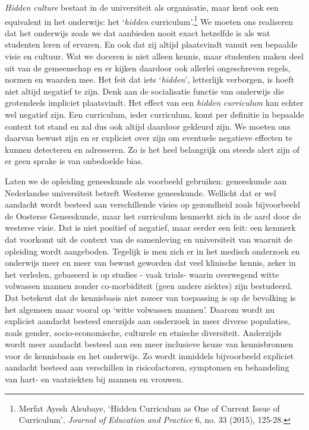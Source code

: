 \documentclass[smallauthor, chapterhaspagenum, nochapterinheader, pagenuminheader,  bigchapnum,medium2, tocpages,  garamond, titleinheader]{jote-book}
\begin{document}
	\emph{Hidden}\emph{ culture} bestaat in de universiteit als organisatie, maar kent ook een equivalent in het onderwijs: het ‘\emph{hidden} curriculum'.\footnote{Merfat Ayesh Alsubaye, ‘Hidden Curriculum as One of Current Issue of Curriculum', \emph{Journal of }\emph{Education}\emph{ }\emph{and}\emph{ }\emph{Practice}\emph{ }6, no. 33 (2015), 125-28.} We moeten ons realiseren dat het onderwijs zoals we dat aanbieden nooit exact hetzelfde is als wat studenten leren of ervaren. En ook dat zij altijd plaatsvindt vanuit een bepaalde visie en cultuur. Wat we doceren is niet alleen kennis, maar studenten maken deel uit van de gemeenschap en er kijken daardoor ook allerlei ongeschreven regels, normen en waarden mee. Het feit dat iets ‘\emph{hidden}', letterlijk verborgen, is hoeft niet altijd negatief te zijn. Denk aan de socialisatie functie van onderwijs die grotendeels impliciet plaatsvindt. Het effect van een \emph{hidden}\emph{ curriculum} kan echter wel negatief zijn. Een curriculum, ieder curriculum, komt per definitie in bepaalde context tot stand en zal dus ook altijd daardoor gekleurd zijn. We moeten ons daarvan bewust zijn en er expliciet over zijn om eventuele negatieve effecten te kunnen detecteren en adresseren. Zo is het heel belangrijk om steeds alert zijn of er geen sprake is van onbedoelde bias.



	Laten we de opleiding geneeskunde als voorbeeld gebruiken: geneeskunde aan Nederlandse universiteit betreft Westerse geneeskunde. Wellicht dat er wel aandacht wordt besteed aan verschillende visies op gezondheid zoals bijvoorbeeld de Oosterse Geneeskunde, maar het curriculum kenmerkt zich in de aard door de westerse visie. Dat is niet positief of negatief, maar eerder een feit: een kenmerk dat voorkomt uit de context van de samenleving en universiteit van waaruit de opleiding wordt aangeboden. Tegelijk is men zich er in het medisch onderzoek en onderwijs meer en meer van bewust geworden dat veel klinische kennis, zeker in het verleden, gebaseerd is op studies - vaak trials- waarin overwegend witte volwassen mannen zonder co-morbiditeit (geen andere ziektes) zijn bestudeerd. Dat betekent dat de kennisbasis niet zozeer van toepassing is op de bevolking is het algemeen maar vooral op ‘witte volwassen mannen'. Daarom wordt nu expliciet aandacht besteed enerzijds aan onderzoek in meer diverse populaties, zoals gender, socio-economische, culturele en etnische diversiteit. Anderzijds wordt meer aandacht besteed aan een meer inclusieve keuze van kennisbronnen voor de kennisbasis en het onderwijs. Zo wordt inmiddels bijvoorbeeld expliciet aandacht besteed aan verschillen in risicofactoren, symptomen en behandeling van hart- en vaatziekten bij mannen en vrouwen.
\end{document}
